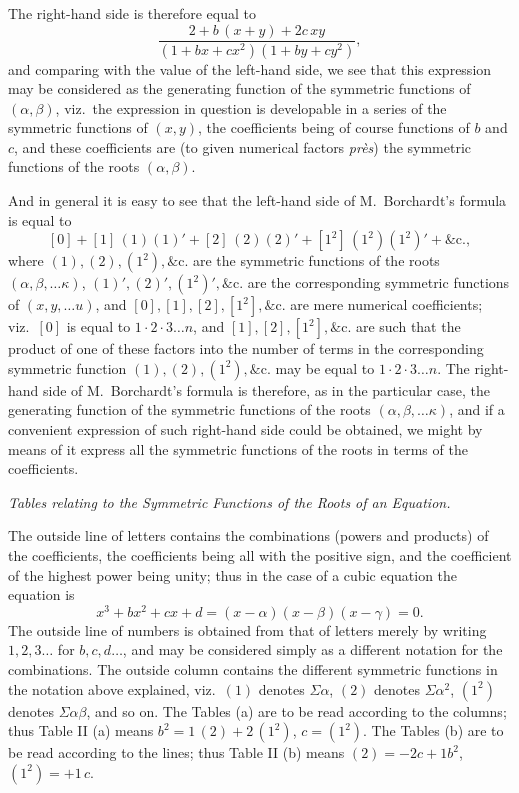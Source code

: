 \documentclass[11pt]{article}
\begin{document}
The right-hand side is therefore equal to
\[
\frac{2 + b\,(x + y) + 2 c\, x y}{(1 + b x + c x^2)(1 + b y + c y^2)},
\]
and comparing with the value of the left-hand side, we see that this expression may be considered as the generating function of the symmetric functions of $(\alpha, \beta)$, viz.\ the expression in question is developable in a series of the symmetric functions of $(x, y)$, the coefficients being of course functions of $b$ and $c$, and these coefficients are (to given numerical factors \textit{pr\`es}) the symmetric functions of the roots $(\alpha, \beta)$.

\medskip

And in general it is easy to see that the left-hand side of M.~Borchardt's formula is equal to
\[
[0] + [1]\,(1)(1)' + [2]\,(2)(2)' + [1^2]\,(1^2)(1^2)' + \&\text{c.},
\]
where $(1), (2), (1^2), \&\text{c.}$ are the symmetric functions of the roots $(\alpha, \beta, \ldots\kappa)$, $(1)', (2)', (1^2)', \&\text{c.}$ are the corresponding symmetric functions of $(x, y, \ldots u)$, and $[0], [1], [2], [1^2], \&\text{c.}$ are mere numerical coefficients; viz.\ $[0]$ is equal to $1\cdot 2\cdot 3\ldots n$, and $[1], [2], [1^2], \&\text{c.}$ are such that the product of one of these factors into the number of terms in the corresponding symmetric function $(1), (2), (1^2), \&\text{c.}$ may be equal to $1\cdot 2\cdot 3\ldots n$. The right-hand side of M.~Borchardt's formula is therefore, as in the particular case, the generating function of the symmetric functions of the roots $(\alpha, \beta, \ldots\kappa)$, and if a convenient expression of such right-hand side could be obtained, we might by means of it express all the symmetric functions of the roots in terms of the coefficients.

\bigskip

\begin{center}\textit{Tables relating to the Symmetric Functions of the Roots of an Equation.}\end{center}

\medskip

The outside line of letters contains the combinations (powers and products) of the coefficients, the coefficients being all with the positive sign, and the coefficient of the highest power being unity; thus in the case of a cubic equation the equation is
\[
x^3 + b x^2 + c x + d = (x - \alpha)(x - \beta)(x - \gamma) = 0.
\]
The outside line of numbers is obtained from that of letters merely by writing $1, 2, 3\ldots$ for $b, c, d\ldots$, and may be considered simply as a different notation for the combinations. The outside column contains the different symmetric functions in the notation above explained, viz.\ $(1)$ denotes $\Sigma\alpha$, $(2)$ denotes $\Sigma\alpha^2$, $(1^2)$ denotes $\Sigma\alpha\beta$, and so on. The Tables (a) are to be read according to the columns; thus Table II (a) means $b^2 = 1\,(2) + 2\,(1^2)$, $c = (1^2)$. The Tables (b) are to be read according to the lines; thus Table II (b) means $(2) = -2 c + 1 b^2$, $(1^2) = +1\, c$.
\end{document}
